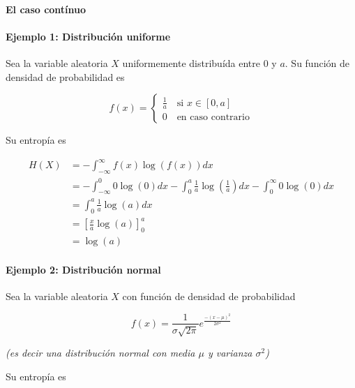 \paragraph{El caso contínuo}\label{el-caso-contuxednuo}

\paragraph{Ejemplo 1: Distribución
uniforme}\label{ejemplo-1-distribuciuxf3n-uniforme}

Sea la variable aleatoria \(X\) uniformemente distribuída entre \(0\) y
\(a\). Su función de densidad de probabilidad es

\[
f(x)=\begin{cases}
\frac{1}{a}\quad\text{si }x\in\left[0,a\right]\\
0\quad\text{en caso contrario}
\end{cases}
\]

Su entropía es

\begin{align*}
H(X) &= -\int_{-\infty}^\infty f(x)\log\left(f(x)\right)dx\\
&= -\int_{-\infty}^0 0\log(0)dx - \int_0^a \frac{1}{a}\log\left(\frac{1}{a}\right)dx - \int_0^{\infty} 0\log(0)dx\\
&= \int_0^a \frac{1}{a}\log(a)dx\\
&= \left[\frac{x}{a}\log(a)\right]_0^a\\
&= \log(a)
\end{align*}


\paragraph{Ejemplo 2: Distribución
normal}\label{ejemplo-2-distribuciuxf3n-normal}

Sea la variable aleatoria \(X\) con función de densidad de probabilidad

\[
f(x) = \frac{1}{\sigma\sqrt{2\pi}}e^{\frac{-(x-\mu)^2}{2\sigma^2}}
\]

\emph{(es decir una distribución normal con media \(\mu\) y varianza
\(\sigma^2\))}

Su entropía es


